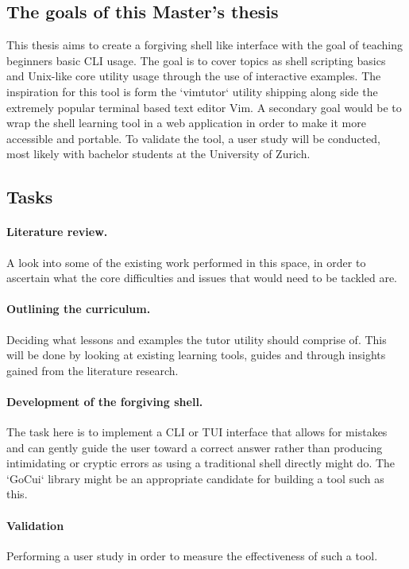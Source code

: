 \documentclass{task_description}
\begin{document}
\subsection*{The goals of this Master's thesis}

This thesis aims to create a forgiving shell like interface with the goal of
teaching beginners basic CLI usage. The goal is to cover topics as shell
scripting basics and Unix-like core utility usage through the use of
interactive examples. The inspiration for this tool is form the `vimtutor`
\cite{pierce_ware_smith_moolenaar_2019} utility shipping along side the
extremely popular terminal based text editor Vim. A secondary goal would be to
wrap the shell learning tool in a web application in order to make it more
accessible and portable. To validate the tool, a user study will be conducted,
most likely with bachelor students at the University of Zurich.

\subsection*{Tasks}

\paragraph{Literature review.} A look into some of the existing work performed in
this space, in order to ascertain what the core difficulties and issues that
would need to be tackled are. 

\paragraph{Outlining the curriculum.} Deciding what lessons and examples
the tutor utility should comprise of. This will be done by looking at existing
learning tools, guides and through insights gained from the literature
research.

\paragraph{Development of the forgiving shell.} The task here is to
implement a CLI or TUI interface that allows for mistakes and can gently guide
the user toward a correct answer rather than producing intimidating or cryptic
errors as using a traditional shell directly might do. The `GoCui` library
might be an appropriate candidate for building a tool such as this.

\paragraph{Validation} Performing a user study in order to measure the
effectiveness of such a tool.
\end{document}
